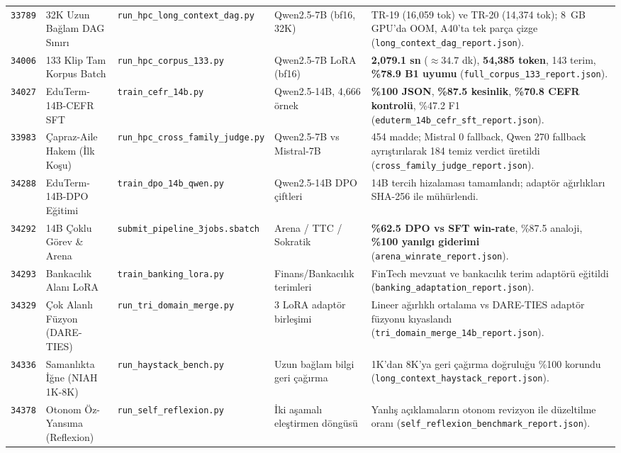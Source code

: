 \documentclass[10pt,a4paper]{article}
\begin{document}
\begin{tabularx}{\textwidth}{lp{2.8cm}p{3.4cm}p{3.2cm}X}
\addlinespace
\texttt{33789} & 32K Uzun Bağlam DAG Sınırı & \texttt{run\_hpc\_long\_context\_dag.py} & Qwen2.5-7B (bf16, 32K) & TR-19 (16,059 tok) ve TR-20 (14,374 tok); 8~GB GPU'da OOM, A40'ta tek parça çizge (\texttt{long\_context\_dag\_report.json}). \\
\addlinespace
\texttt{34006} & 133 Klip Tam Korpus Batch & \texttt{run\_hpc\_corpus\_133.py} & Qwen2.5-7B LoRA (bf16) & \textbf{2,079.1 sn} ($\approx 34.7$ dk), \textbf{54,385 token}, 143 terim, \textbf{\%78.9 B1 uyumu} (\texttt{full\_corpus\_133\_report.json}). \\
\addlinespace
\texttt{34027} & EduTerm-14B-CEFR SFT & \texttt{train\_cefr\_14b.py} & Qwen2.5-14B, 4,666 örnek & \textbf{\%100 JSON}, \textbf{\%87.5 kesinlik}, \textbf{\%70.8 CEFR kontrolü}, \%47.2 F1 (\texttt{eduterm\_14b\_cefr\_sft\_report.json}). \\
\addlinespace
\texttt{33983} & Çapraz-Aile Hakem (İlk Koşu) & \texttt{run\_hpc\_cross\_family\_judge.py} & Qwen2.5-7B vs Mistral-7B & 454 madde; Mistral 0 fallback, Qwen 270 fallback ayrıştırılarak 184 temiz verdict üretildi (\texttt{cross\_family\_judge\_report.json}). \\
\addlinespace
\texttt{34288} & EduTerm-14B-DPO Eğitimi & \texttt{train\_dpo\_14b\_qwen.py} & Qwen2.5-14B DPO çiftleri & 14B tercih hizalaması tamamlandı; adaptör ağırlıkları SHA-256 ile mühürlendi. \\
\addlinespace
\texttt{34292} & 14B Çoklu Görev \& Arena & \texttt{submit\_pipeline\_3jobs.sbatch} & Arena / TTC / Sokratik & \textbf{\%62.5 DPO vs SFT win-rate}, \%87.5 analoji, \textbf{\%100 yanılgı giderimi} (\texttt{arena\_winrate\_report.json}). \\
\addlinespace
\texttt{34293} & Bankacılık Alanı LoRA & \texttt{train\_banking\_lora.py} & Finans/Bankacılık terimleri & FinTech mevzuat ve bankacılık terim adaptörü eğitildi (\texttt{banking\_adaptation\_report.json}). \\
\addlinespace
\texttt{34329} & Çok Alanlı Füzyon (DARE-TIES) & \texttt{run\_tri\_domain\_merge.py} & 3 LoRA adaptör birleşimi & Lineer ağırlıklı ortalama vs DARE-TIES adaptör füzyonu kıyaslandı (\texttt{tri\_domain\_merge\_14b\_report.json}). \\
\addlinespace
\texttt{34336} & Samanlıkta İğne (NIAH 1K-8K) & \texttt{run\_haystack\_bench.py} & Uzun bağlam bilgi geri çağırma & 1K'dan 8K'ya geri çağırma doğruluğu \%100 korundu (\texttt{long\_context\_haystack\_report.json}). \\
\addlinespace
\texttt{34378} & Otonom Öz-Yansıma (Reflexion) & \texttt{run\_self\_reflexion.py} & İki aşamalı eleştirmen döngüsü & Yanlış açıklamaların otonom revizyon ile düzeltilme oranı (\texttt{self\_reflexion\_benchmark\_report.json}). \\

\end{tabularx}
\end{document}
